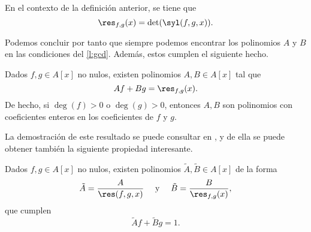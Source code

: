 \begin{proposicion}
    En el contexto de la definición anterior, se tiene que 
    \begin{equation*}
        \res_{f,g}(x) = \det(\syl(f,g,x)).
    \end{equation*}
\end{proposicion}
Podemos concluir por tanto que siempre podemos encontrar los polinomios $A$ y $B$ en las condiciones del \autoref{l:gcd}. Además, estos cumplen el siguiente hecho.
\begin{proposicion}
    Dados $f,g\in A[x]$ no nulos, existen polinomios $A,B\in A[x]$ tal que  
    $$Af+Bg = \res_{f,g}(x).$$
    De hecho, si $\deg(f)>0$ o $\deg(g)>0$, entonces $A,B$ son polinomios con coeficientes enteros en los coeficientes de $f$ y $g$.
\end{proposicion}
La demostración de este resultado se puede consultar en \cite{ideals_varieties}, y de ella se puede obtener también la siguiente propiedad interesante.
\begin{proposicion}
    Dados $f,g\in A[x]$ no nulos, existen polinomios $\tilde{A}, \tilde{B} \in A[x]$ de la forma
    \begin{equation*}
        \tilde{A} = \frac{A}{\res(f,g,x)}\quad \text{ y }\quad \tilde{B} = \frac{B}{\res_{f,g}(x)},
    \end{equation*}
    que cumplen
    \begin{equation*}
        \tilde{A}f + \tilde{B}g = 1.
    \end{equation*}
\end{proposicion}



